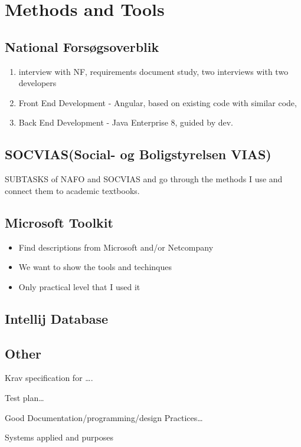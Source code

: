 \documentclass[../main.tex]{subfiles}
\begin{document}
\section{Methods and Tools}
\label{sec:methods}
\subsection{National Forsøgsoverblik}
\begin{enumerate}
\item interview with NF, requirements document study, two interviews with two developers 
\item Front End Development - Angular, based on existing code with similar code,  
\item Back End Development - Java Enterprise 8, guided by dev. 
\end{enumerate}
\subsection{SOCVIAS(Social- og Boligstyrelsen VIAS)}


SUBTASKS of NAFO and SOCVIAS and go through the methods I use and connect them to academic textbooks.  


\subsection{Microsoft Toolkit}

\begin{itemize}
\item Find descriptions from Microsoft and/or Netcompany
\item We want to show the tools and techinques
\item Only practical level that I used it
\end{itemize}

\subsection{Intellij Database}
\subsection{Other}
Krav specification for …. 

Test plan… 

Good Documentation/programming/design Practices… 

Systems applied and purposes 
\end{document}
